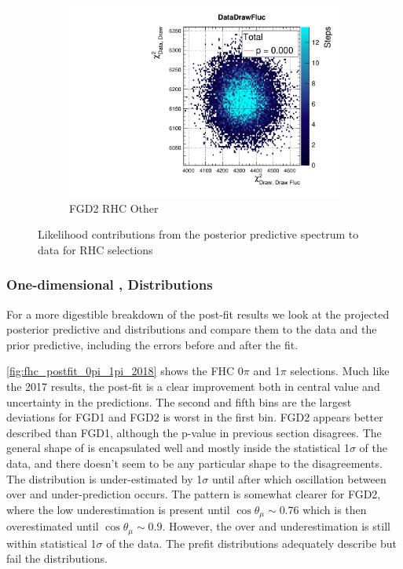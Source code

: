 \begin{figure}[h]
\begin{subfigure}[t]{0.32\textwidth}
		\includegraphics[width=\textwidth, trim={20mm 6mm 4mm 11mm}, clip,page=160]{figures/mach3/2018/data/2018a_FixedCov_RedCov_Mpi_Data_merge_PostPredStore_FullLLH_procs}
		\caption{FGD2 RHC \numu Other}
	\end{subfigure}
	\caption{Likelihood contributions from the posterior predictive spectrum to data for RHC \numu selections}
	\label{fig:posterior_pred_data_rhcnumu_2018}
\end{figure}

\subsubsection{One-dimensional \pmu, \cosmu Distributions}
For a more digestible breakdown of the post-fit results we look at the projected posterior predictive \pmu and \cosmu distributions and compare them to the data and the prior predictive, including the errors before and after the fit.

\autoref{fig:fhc_postfit_0pi_1pi_2018} shows the FHC 0$\pi$ and 1$\pi$ selections. Much like the 2017 results, the post-fit is a clear improvement both in central value and uncertainty in the predictions. The second and fifth \pmu bins are the largest deviations for FGD1 and FGD2 is worst in the first bin. FGD2 appears better described than FGD1, although the p-value in previous section disagrees. The general shape of \pmu is encapsulated well and mostly inside the statistical 1$\sigma$ of the data, and there doesn't seem to be any particular shape to the disagreements. The \cosmu distribution is under-estimated by 1$\sigma$ until  after which oscillation between over and under-prediction occurs. The pattern is somewhat clearer for FGD2, where the low \cosmu underestimation is present until $\cos\theta_\mu\sim0.76$ which is then overestimated until $\cos\theta_\mu\sim0.9$. However, the over and underestimation is still within statistical 1$\sigma$ of the data. The prefit distributions adequately describe \cosmu but fail the \pmu distributions.

